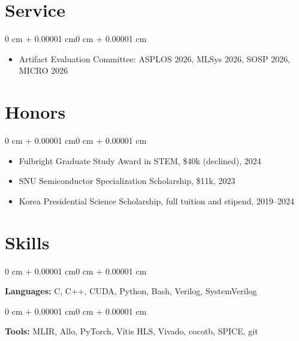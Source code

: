 \documentclass[10pt, letterpaper]{article}
\newenvironment{highlightsforbulletentries}{
    \begin{itemize}[
        topsep=0.06 cm, parsep=0.06 cm, partopsep=0pt,
        itemsep=0pt, leftmargin=10pt
    ]
}{
    \end{itemize}
}
\newenvironment{onecolentry}{
    \begin{adjustwidth}{0 cm + 0.00001 cm}{0 cm + 0.00001 cm}
}{
    \end{adjustwidth}
}
\begin{document}
    \section{Service}

        \begin{onecolentry}
            \begin{highlightsforbulletentries}
                \item Artifact Evaluation Committee: ASPLOS 2026, MLSys 2026, SOSP 2026, MICRO 2026
            \end{highlightsforbulletentries}
        \end{onecolentry}


    \section{Honors}

        \begin{onecolentry}
            \begin{highlightsforbulletentries}
                \item Fulbright Graduate Study Award in STEM, \$40k (declined), 2024
                \item SNU Semiconductor Specialization Scholarship, \$11k, 2023
                \item Korea Presidential Science Scholarship, full tuition and stipend, 2019--2024
            \end{highlightsforbulletentries}
        \end{onecolentry}


    \section{Skills}

        \begin{onecolentry}
            \textbf{Languages:} C, C++, CUDA, Python, Bash, Verilog, SystemVerilog
        \end{onecolentry}

        \vspace{0.12 cm}

        \begin{onecolentry}
            \textbf{Tools:} MLIR, Allo, PyTorch, Vitis HLS, Vivado, cocotb, SPICE, git
        \end{onecolentry}
\end{document}

